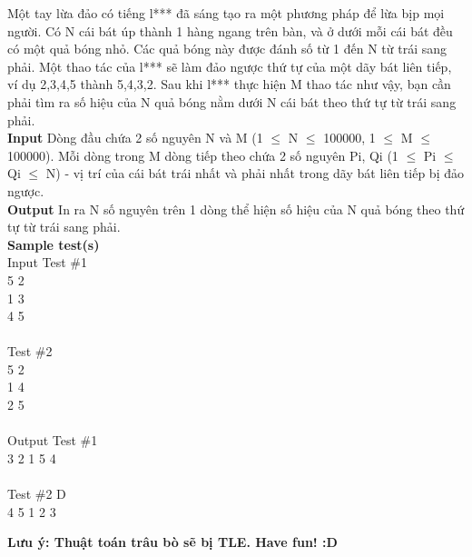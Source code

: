 





     Một tay lừa đảo có tiếng l*** đã sáng tạo ra một phương pháp để lừa bịp mọi người. Có N cái bát úp thành 1 hàng ngang trên bàn, và ở dưới mỗi cái bát đều có một quả bóng nhỏ. Các quả bóng này được đánh số từ 1 đến N từ trái sang phải. Một thao tác của l*** sẽ làm đảo ngược thứ tự của một dãy bát liên tiếp, ví dụ 2,3,4,5 thành 5,4,3,2. Sau khi l*** thực hiện M thao tác như vậy, bạn cần phải tìm ra số hiệu của N quả bóng nằm dưới N cái bát theo thứ tự từ trái sang phải.       
\\\textbf{    Input   }       Dòng đầu chứa 2 số nguyên N và M (1 $\le$ N $\le$ 100000,  1 $\le$ M $\le$ 100000). Mỗi dòng trong M dòng tiếp theo chứa 2 số nguyên Pi, Qi (1 $\le$ Pi $\le$ Qi $\le$ N) - vị trí của cái bát trái nhất và phải nhất trong dãy bát liên tiếp bị đảo ngược.       
\\\textbf{    Output   }       In ra N số nguyên trên 1 dòng thể hiện số hiệu của N quả bóng theo thứ tự từ trái sang phải.       
\\\textbf{    Sample test(s)   }
\\   Input           Test \#1    
\\    5 2    
\\    1 3    
\\    4 5    
\\
\\    Test \#2    
\\    5 2    
\\    1 4    
\\    2 5    
\\
\\   Output           Test \#1    
\\    3 2 1 5 4    
\\
\\    Test \#2 D    
\\    4 5 1 2 3   

\textbf{    Lưu ý: Thuật toán trâu bò sẽ bị TLE. Have fun! :D    
\\}

